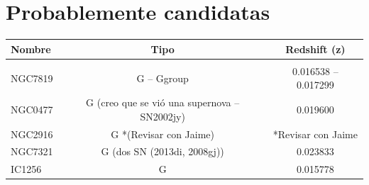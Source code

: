 \documentclass[9pt]{revtex4-1}
\begin{document}
\section{Probablemente candidatas}

\begin{center}
\begin{tabular}{ l c c }
Nombre & Tipo & Redshift (z) \\
\hline
\hline \\
NGC7819 & G -- Ggroup & 0.016538 -- 0.017299 \\
NGC0477 & G (creo que se vi\'o una supernova -- SN2002jy) & 0.019600 \\
NGC2916 & G *(Revisar con Jaime) & *Revisar con Jaime \\
NGC7321 & G (dos SN (2013di, 2008gj)) & 0.023833 \\
IC1256  & G & 0.015778 \\

\end{tabular}
\end{center}
\end{document}
